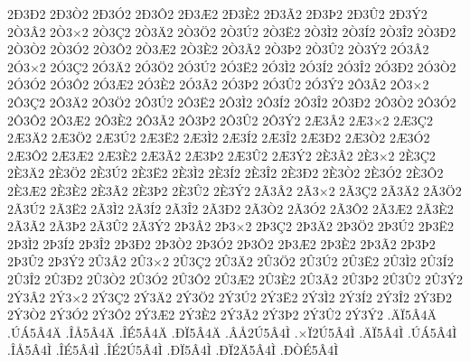 {2^^d03^^d02
2^^d03^^d22
2^^d03^^d32
2^^d03^^d42
2^^d03^^c62
2^^d03^^c82
2^^d03^^c32
2^^d03^^de2
2^^d03^^db2
2^^d03^^dd2
2^^d23^^c22
2^^d23^^d72
2^^d23^^c72
2^^d23^^c42
2^^d23^^d62
2^^d23^^da2
2^^d23^^cb2
2^^d23^^cc2
2^^d23^^cd2
2^^d23^^ce2
2^^d23^^d02
2^^d23^^d22
2^^d23^^d32
2^^d23^^d42
2^^d23^^c62
2^^d23^^c82
2^^d23^^c32
2^^d23^^de2
2^^d23^^db2
2^^d23^^dd2
2^^d33^^c22
2^^d33^^d72
2^^d33^^c72
2^^d33^^c42
2^^d33^^d62
2^^d33^^da2
2^^d33^^cb2
2^^d33^^cc2
2^^d33^^cd2
2^^d33^^ce2
2^^d33^^d02
2^^d33^^d22
2^^d33^^d32
2^^d33^^d42
2^^d33^^c62
2^^d33^^c82
2^^d33^^c32
2^^d33^^de2
2^^d33^^db2
2^^d33^^dd2
2^^d43^^c22
2^^d43^^d72
2^^d43^^c72
2^^d43^^c42
2^^d43^^d62
2^^d43^^da2
2^^d43^^cb2
2^^d43^^cc2
2^^d43^^cd2
2^^d43^^ce2
2^^d43^^d02
2^^d43^^d22
2^^d43^^d32
2^^d43^^d42
2^^d43^^c62
2^^d43^^c82
2^^d43^^c32
2^^d43^^de2
2^^d43^^db2
2^^d43^^dd2
2^^c63^^c22
2^^c63^^d72
2^^c63^^c72
2^^c63^^c42
2^^c63^^d62
2^^c63^^da2
2^^c63^^cb2
2^^c63^^cc2
2^^c63^^cd2
2^^c63^^ce2
2^^c63^^d02
2^^c63^^d22
2^^c63^^d32
2^^c63^^d42
2^^c63^^c62
2^^c63^^c82
2^^c63^^c32
2^^c63^^de2
2^^c63^^db2
2^^c63^^dd2
2^^c83^^c22
2^^c83^^d72
2^^c83^^c72
2^^c83^^c42
2^^c83^^d62
2^^c83^^da2
2^^c83^^cb2
2^^c83^^cc2
2^^c83^^cd2
2^^c83^^ce2
2^^c83^^d02
2^^c83^^d22
2^^c83^^d32
2^^c83^^d42
2^^c83^^c62
2^^c83^^c82
2^^c83^^c32
2^^c83^^de2
2^^c83^^db2
2^^c83^^dd2
2^^c33^^c22
2^^c33^^d72
2^^c33^^c72
2^^c33^^c42
2^^c33^^d62
2^^c33^^da2
2^^c33^^cb2
2^^c33^^cc2
2^^c33^^cd2
2^^c33^^ce2
2^^c33^^d02
2^^c33^^d22
2^^c33^^d32
2^^c33^^d42
2^^c33^^c62
2^^c33^^c82
2^^c33^^c32
2^^c33^^de2
2^^c33^^db2
2^^c33^^dd2
2^^de3^^c22
2^^de3^^d72
2^^de3^^c72
2^^de3^^c42
2^^de3^^d62
2^^de3^^da2
2^^de3^^cb2
2^^de3^^cc2
2^^de3^^cd2
2^^de3^^ce2
2^^de3^^d02
2^^de3^^d22
2^^de3^^d32
2^^de3^^d42
2^^de3^^c62
2^^de3^^c82
2^^de3^^c32
2^^de3^^de2
2^^de3^^db2
2^^de3^^dd2
2^^db3^^c22
2^^db3^^d72
2^^db3^^c72
2^^db3^^c42
2^^db3^^d62
2^^db3^^da2
2^^db3^^cb2
2^^db3^^cc2
2^^db3^^cd2
2^^db3^^ce2
2^^db3^^d02
2^^db3^^d22
2^^db3^^d32
2^^db3^^d42
2^^db3^^c62
2^^db3^^c82
2^^db3^^c32
2^^db3^^de2
2^^db3^^db2
2^^db3^^dd2
2^^dd3^^c22
2^^dd3^^d72
2^^dd3^^c72
2^^dd3^^c42
2^^dd3^^d62
2^^dd3^^da2
2^^dd3^^cb2
2^^dd3^^cc2
2^^dd3^^cd2
2^^dd3^^ce2
2^^dd3^^d02
2^^dd3^^d22
2^^dd3^^d32
2^^dd3^^d42
2^^dd3^^c62
2^^dd3^^c82
2^^dd3^^c32
2^^dd3^^de2
2^^dd3^^db2
2^^dd3^^dd2
.^^c4^^cf5^^c24^^c4
.^^da^^c15^^c24^^c4
.^^ce^^c55^^c24^^c4
.^^ce^^c95^^c24^^c4
.^^d0^^cf5^^c24^^c4
.^^c2^^c52^^da5^^c24^^cc
.^^d7^^cf2^^da5^^c24^^cc
.^^c4^^cf5^^c24^^cc
.^^da^^c15^^c24^^cc
.^^ce^^c55^^c24^^cc
.^^ce^^c95^^c24^^cc
.^^ce^^c92^^da5^^c24^^cc
.^^d0^^cf5^^c24^^cc
.^^d0^^cf2^^c45^^c24^^cc
.^^d0^^d2^^c95^^c24^^cc
}
